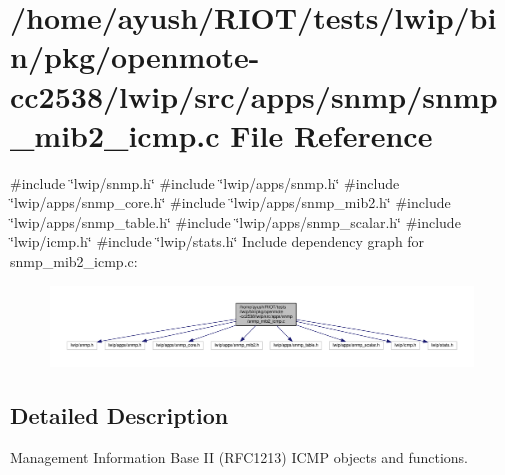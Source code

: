 \hypertarget{openmote-cc2538_2lwip_2src_2apps_2snmp_2snmp__mib2__icmp_8c}{}\section{/home/ayush/\+R\+I\+O\+T/tests/lwip/bin/pkg/openmote-\/cc2538/lwip/src/apps/snmp/snmp\+\_\+mib2\+\_\+icmp.c File Reference}
\label{openmote-cc2538_2lwip_2src_2apps_2snmp_2snmp__mib2__icmp_8c}
{\ttfamily \#include \char`\"{}lwip/snmp.\+h\char`\"{}}\newline
{\ttfamily \#include \char`\"{}lwip/apps/snmp.\+h\char`\"{}}\newline
{\ttfamily \#include \char`\"{}lwip/apps/snmp\+\_\+core.\+h\char`\"{}}\newline
{\ttfamily \#include \char`\"{}lwip/apps/snmp\+\_\+mib2.\+h\char`\"{}}\newline
{\ttfamily \#include \char`\"{}lwip/apps/snmp\+\_\+table.\+h\char`\"{}}\newline
{\ttfamily \#include \char`\"{}lwip/apps/snmp\+\_\+scalar.\+h\char`\"{}}\newline
{\ttfamily \#include \char`\"{}lwip/icmp.\+h\char`\"{}}\newline
{\ttfamily \#include \char`\"{}lwip/stats.\+h\char`\"{}}\newline
Include dependency graph for snmp\+\_\+mib2\+\_\+icmp.\+c\+:
\nopagebreak
\begin{figure}[H]
\begin{center}
\leavevmode
\includegraphics[width=350pt]{openmote-cc2538_2lwip_2src_2apps_2snmp_2snmp__mib2__icmp_8c__incl}
\end{center}
\end{figure}


\subsection{Detailed Description}
Management Information Base II (R\+F\+C1213) I\+C\+MP objects and functions. 